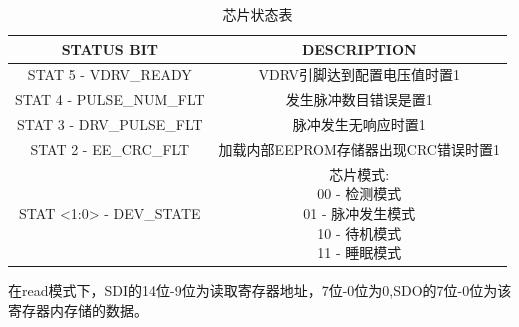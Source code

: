     \begin{table}[H]
        \centering
        \caption{芯片状态表}
        \songti{}
        \begin{tabular}{c|c}
            \hline
            \textbf{STATUS BIT }& \textbf{DESCRIPTION}      \\ \hline
            STAT 5 - VDRV\_READY    &   VDRV引脚达到配置电压值时置1  \\ \hline
            STAT 4 - PULSE\_NUM\_FLT &  发生脉冲数目错误是置1  \\\hline
            STAT 3 - DRV\_PULSE\_FLT &  脉冲发生无响应时置1 \\\hline
            STAT 2 - EE\_CRC\_FLT & 加载内部EEPROM存储器出现CRC错误时置1\\\hline
            STAT <1:0> - DEV\_STATE  &  \makecell{芯片模式:\\
                                        00 - 检测模式\\
                                        01 - 脉冲发生模式\\
                                        10 - 待机模式\\
                                        11 - 睡眠模式} \\\hline
            
      
            \end{tabular}
        \label{芯片状态表}    
         \end{table}
    在read模式下，SDI的14位-9位为读取寄存器地址，7位-0位为0,SDO的7位-0位为该寄存器内存储的数据。
    
    


